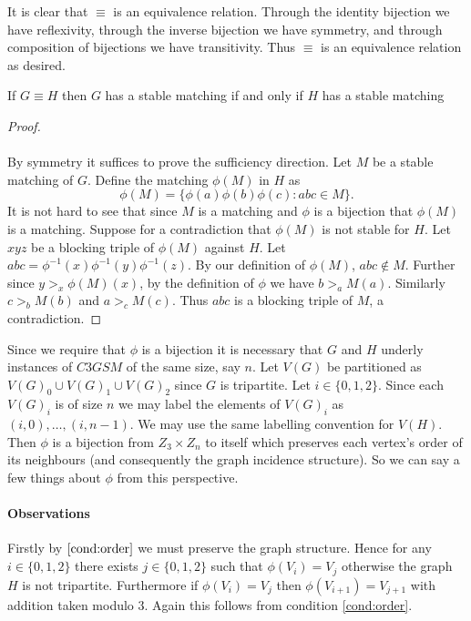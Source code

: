 \begin{note}
It is clear that $\equiv$ is an equivalence relation. Through the identity bijection we have reflexivity, through the inverse bijection we have symmetry, and through composition of bijections we have transitivity. Thus $\equiv$ is an equivalence relation as desired.
\end{note}
 \begin{lemma}\label{lemma:equiv}
 If $G \equiv H$ then $G$ has a stable matching if and only if $H$ has a stable matching
 \end{lemma}
 \begin{proof}
 \paragraph{}
 By symmetry it suffices to prove the sufficiency direction. Let $M$ be a stable matching of $G$. Define the matching $\phi(M)$ in $H$ as
 $$\phi(M) = \{ \phi(a)\phi(b)\phi(c): abc \in M \}.$$
 It is not hard to see that since $M$ is a matching and $\phi$ is a bijection that $\phi(M)$ is a matching. Suppose for a contradiction that $\phi(M)$ is not stable for $H$. Let $xyz$ be a blocking triple of $\phi(M)$ against $H$. Let $abc = \phi^{-1}(x)\phi^{-1}(y)\phi^{-1}(z)$. By our definition of $\phi(M)$, $abc \not\in M$. Further since $y >_x \phi(M)(x)$, by the definition of $\phi$ we have $b >_a M(a)$. Similarly $c>_b M(b)$ and $a>_c M(c)$. Thus $abc$ is a blocking triple of $M$, a contradiction.
 \end{proof}
 \begin{note}\label{note:labels}
 Since we require that $\phi$ is a bijection it is necessary that $G$ and $H$ underly instances of $C3GSM$ of the same size, say $n$. Let $V(G)$ be partitioned as $V(G)_0 \cup V(G)_1 \cup V(G)_2$ since $G$ is tripartite. Let $i \in \{0,1,2\}$. Since each $V(G)_i$ is of size $n$ we may label the elements of $V(G)_i$ as $(i,0), \dots, (i,n-1)$. We may use the same labelling convention for $V(H)$. Then $\phi$ is a bijection from $Z_3 \times Z_n$ to itself which preserves each vertex's order of its neighbours (and consequently the graph incidence structure). So we can say a few things about $\phi$ from this perspective.
 \end{note}
 \paragraph{Observations} Firstly by $\ref{cond:order}$ we must preserve the graph structure. Hence for any $i \in \{0,1,2\}$ there exists $j \in \{0,1, 2\}$ such that $\phi(V_i) = V_j$ otherwise the graph $H$ is not tripartite. Furthermore if $\phi(V_i) = V_j$ then $\phi(V_{i+1}) = V_{j+1}$ with addition taken modulo $3$. Again this follows from condition \ref{cond:order}.
